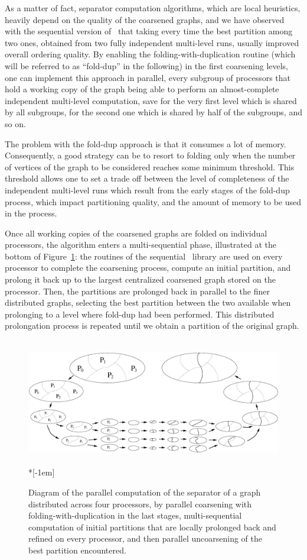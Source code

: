 As a matter of fact, separator computation algorithms, which are local
heuristics, heavily depend on the quality of the coarsened graphs,
and we have observed with the sequential version of \scotch\ that
taking every time the best partition among two ones, obtained from
two fully independent multi-level runs, usually improved overall ordering
quality. By enabling the folding-with-duplication routine (which will
be referred to as ``fold-dup'' in the following) in the first
coarsening levels, one can implement this approach in parallel, every
subgroup of processors that hold a working copy of the graph being
able to perform an almost-complete independent multi-level
computation, save for the very first level which is shared by all
subgroups, for the second one which is shared by half of the subgroups,
and so on.

The problem with the fold-dup approach is that it consumes a lot of
memory. Consequently, a good strategy can be to resort to folding only
when the number of vertices of the graph to be considered reaches some
minimum threshold. This threshold allows one to set a trade off
between the level of completeness of the independent multi-level runs
which result from the early stages of the fold-dup process, which
impact partitioning quality, and the amount of memory to be used in
the process.

Once all working copies of the coarsened graphs are folded on
individual processors, the algorithm enters a multi-sequential phase,
illustrated at the bottom of Figure~\ref{fig-sepa}: the routines of
the sequential \scotch\ library are used on every processor to
complete the coarsening process, compute an initial partition, and
prolong it back up to the largest centralized coarsened graph stored
on the processor. Then, the partitions are prolonged back in parallel
to the finer distributed graphs, selecting the best partition between
the two available when prolonging to a level where fold-dup had been
performed. This distributed prolongation process is repeated until we
obtain a partition of the original graph.

\begin{figure}
~\hfill%
\includegraphics[scale=0.30]{p_f_sepa.eps}
\hfill~\\*[-1em]
\caption{Diagram of the parallel computation of the separator of a
  graph distributed across four processors, by parallel coarsening
  with folding-with-duplication in the last stages, multi-sequential
  computation of initial partitions that are locally prolonged back
  and refined on every processor, and then parallel uncoarsening of
  the best partition encountered.}
\label{fig-sepa}
\end{figure}

